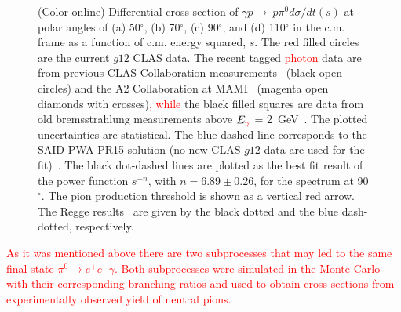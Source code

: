 \documentclass[aps,prc,twocolumn,floatfix,showpacs,preprintnumbers,amsmath,amssymb,superscriptaddress,linenumbers]{revtex4-1}
\begin{document}
\begin{figure}[htb!]
        \caption {(Color online) Differential cross section of 
        	$\gamma p\rightarrow\  p\pi^0 d \sigma/dt(s)$ at polar angles 
        	of (a) 50$^\circ$, (b) 70$^\circ$, 
        	(c) 90$^\circ$, and (d) 
        	110$^\circ$ in the c.m. frame as a function of c.m. energy 
        	squared, $s$. The red filled circles are the current $g12$ 
        	CLAS data. The recent tagged \textcolor{red}{photon} data are from previous 
        	CLAS Collaboration 
        	measurements~\protect\cite{Dugger:2007bt} (black open 
        	circles) and the A2 Collaboration at 
        	MAMI~\protect\cite{Adlarson:2015byy} 
        	(magenta open diamonds with crosses)\textcolor{red}{, while} the black filled 
        	squares are data from old bremsstrahlung measurements above 
        	$E_{\textcolor{red}{\gamma}}$ = 2~GeV~\protect\cite{brem}. The plotted uncertainties are 
        	statistical.  
        	The blue dashed line corresponds to the SAID PWA 
        	PR15 solution (no new CLAS $g12$ data are used 
        	for the fit)~\protect\cite{Adlarson:2015byy}.  The black dot-dashed 
        	lines are plotted as the best fit result of the power function $s^{-n}$, with $n = 6.89\pm$0.26, for the spectrum at 
        	90$^\circ$. The pion production threshold is shown as a vertical 
        	red arrow. The Regge results~\protect\cite{Goldstein:1973xn,
        		Laget:2005be} are given by the black dotted and the blue dash-dotted, 
        	respectively.} \label{fig:scaling}
\end{figure}
\textcolor{red}{
As it was mentioned above there are two subprocesses that may led to the same final state $\pi^0 \rightarrow e^+e^-\gamma$. Both subprocesses
were simulated in the Monte Carlo with their corresponding branching ratios and used to obtain cross sections from experimentally observed yield of neutral pions.}
\end{document}
